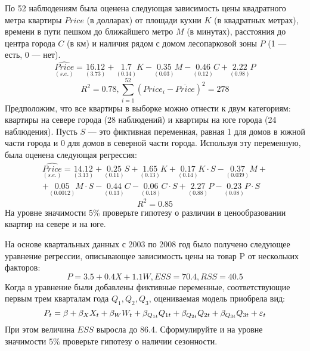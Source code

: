 \documentclass[pdftex,11pt,openany]{book}\usepackage[]{graphicx}\usepackage[]{color}
\begin{document}
\begin{problem}
 По 52 наблюдениям была оценена следующая зависимость цены квадратного метра квартиры $Price$ (в долларах) от площади кухни $K$ (в квадратных метрах), времени в пути пешком до ближайшего метро $M$ (в минутах), расстояния до центра города $C$ (в км) и наличия рядом с домом лесопарковой зоны $P$ (1 --- есть, 0 --- нет).
\[
\underset{(s.e.)}{\widehat{Price}}=\underset{(3.73)}{16.12}+\underset{(0.14)}{1.7}K-\underset{(0.03)}{0.35}M-\underset{(0.12)}{0.46}C+\underset{(0.98)}{2.22}P
\]
\[
R^2=0.78, \sum_{i=1}^{52} {(Price_i-\overline{Price})^2}=278
\]
Предположим, что все квартиры в выборке можно отнести к двум категориям: квартиры на севере города (28 наблюдений) и квартиры на юге города (24 наблюдения). Пусть
$S$ --- это фиктивная переменная, равная 1 для домов в южной части города и 0 для домов в северной части города. Используя эту переменную, была оценена следующая регрессия:
\begin{multline}
\underset{(s.e.)}{\widehat{Price}} =\underset{(3.13)}{14.12}+\underset{(0.11)}{0.25}S+\underset{(0.13)}{1.65}K+\underset{(0.14)}{0.17}K\cdot{S}-\underset{(0.039)}{0.37}M+\\
+\underset{(0.0012)}{0.05}M\cdot{S}-\underset{(0.13)}{0.44}C-\underset{(0.18)}{0.06}C\cdot{S}+\underset{(0.88)}{2.27}P-\underset{(0.08)}{0.23}P\cdot{S}
\end{multline}
\[
R^2 = 0.85
\]
На уровне значимости $5\%$ проверьте гипотезу о различии в ценообразовании квартир на севере и на юге.
\end{problem}

\begin{solution}
\end{solution}


\begin{problem}
 На основе квартальных данных с 2003 по 2008 год было получено следующее уравнение регрессии, описывающее зависимость цены на товар P от нескольких факторов:
\[
P=3.5+0.4X+1.1W, ESS=70.4, RSS=40.5
\]
Когда в уравнение были добавлены фиктивные переменные, соответствующие первым
трем кварталам года $Q_1, Q_2, Q_3$, оцениваемая модель приобрела вид:
\[
P_t=\beta+\beta_X X_t+\beta_W W_t+\beta_{Q_{1t}} Q_{1t}+\beta_{Q_{2t}} Q_{2t}+\beta_{Q_{3t}} Q_{3t}+\varepsilon_t
\]
При этом величина $ESS$ выросла до 86.4. Сформулируйте и на уровне значимости $5\%$ проверьте гипотезу о наличии сезонности.
\end{problem}

\begin{solution}
\end{solution}
\end{document}

